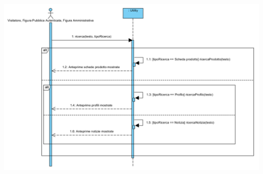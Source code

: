 \begin{center}
			\includegraphics[width=\textwidth]{assets/visualParadigm/sequenza/ricerca}
\end{center}


